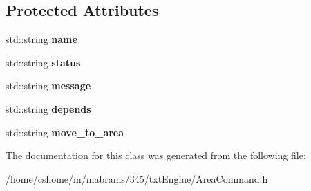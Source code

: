 \subsection*{Protected Attributes}
\begin{DoxyCompactItemize}
\item 
\hypertarget{class_area_command_a3295a37db88c72813df17dd9b4db060f}{
std::string {\bfseries name}}
\label{class_area_command_a3295a37db88c72813df17dd9b4db060f}

\item 
\hypertarget{class_area_command_a4ba177c6d8cc7f074d0642e4fd343f14}{
std::string {\bfseries status}}
\label{class_area_command_a4ba177c6d8cc7f074d0642e4fd343f14}

\item 
\hypertarget{class_area_command_af98d35c3cc1789af861eb8c2511a3d2a}{
std::string {\bfseries message}}
\label{class_area_command_af98d35c3cc1789af861eb8c2511a3d2a}

\item 
\hypertarget{class_area_command_afab48cca59ca37d72e39f24a17fb7c0c}{
std::string {\bfseries depends}}
\label{class_area_command_afab48cca59ca37d72e39f24a17fb7c0c}

\item 
\hypertarget{class_area_command_a5ade0f6aabc1891270b1538a3e028f2f}{
std::string {\bfseries move\_\-to\_\-area}}
\label{class_area_command_a5ade0f6aabc1891270b1538a3e028f2f}

\end{DoxyCompactItemize}


The documentation for this class was generated from the following file:\begin{DoxyCompactItemize}
\item 
/home/cshome/m/mabrams/345/txtEngine/AreaCommand.h\end{DoxyCompactItemize}
